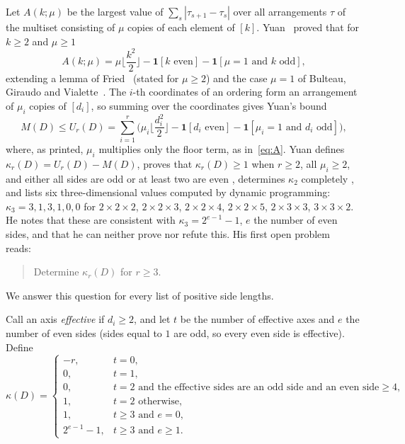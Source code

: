 \documentclass[11pt]{article}
\theoremstyle{remark}
\newcommand{\ind}{\mathbf 1}
\begin{document}
Let $A(k;\mu)$ be the largest value of $\sum_s|\tau_{s+1}-\tau_s|$ over all
arrangements $\tau$ of the multiset consisting of $\mu$ copies of each element
of $[k]$. Yuan~\cite[Theorem~2.3]{yuan} proved that for $k\ge2$ and $\mu\ge1$
\begin{equation}\label{eq:A}
A(k;\mu)=\mu\Big\lfloor\frac{k^2}{2}\Big\rfloor-\ind[k\text{ even}]
-\ind[\mu=1\text{ and }k\text{ odd}],
\end{equation}
extending a lemma of Fried~\cite{fried} (stated for $\mu\ge2$) and the case
$\mu=1$ of Bulteau, Giraudo and Vialette~\cite{bgv}. The $i$-th coordinates of
an ordering form an arrangement of $\mu_i$ copies of $[d_i]$, so summing over
the coordinates gives Yuan's bound~\cite[(6)]{yuan}
\begin{equation}\label{eq:U}
M(D)\le U_r(D)=\sum_{i=1}^r\Big(\mu_i\Big\lfloor\frac{d_i^2}{2}\Big\rfloor
-\ind[d_i\text{ even}]-\ind[\mu_i=1\text{ and }d_i\text{ odd}]\Big),
\end{equation}
where, as printed, $\mu_i$ multiplies only the floor term, as
in~\eqref{eq:A}. Yuan defines
$\kappa_r(D)=U_r(D)-M(D)$, proves that $\kappa_r(D)\ge1$ when $r\ge2$, all
$\mu_i\ge2$, and either all sides are odd or at least two are even
\cite[Proposition~6.1]{yuan}, determines $\kappa_2$ completely
\cite[Section~6.2]{yuan}, and lists six three-dimensional values computed by
dynamic programming:
$\kappa_3=3,1,3,1,0,0$ for $2\times2\times2$, $2\times2\times3$,
$2\times2\times4$, $2\times2\times5$, $2\times3\times3$, $3\times3\times2$.
He notes that these are consistent with $\kappa_3=2^{e-1}-1$, $e$ the number
of even sides, and that he can neither prove nor refute this. His first open
problem~\cite[Section~6.3]{yuan} reads:
\begin{quote}
Determine $\kappa_r(D)$ for $r\ge3$.
\end{quote}
We answer this question for every list of positive side lengths.

Call an axis \emph{effective} if $d_i\ge2$, and let $t$ be the number of
effective axes and $e$ the number of even sides (sides equal to $1$ are odd,
so every even side is effective). Define
\begin{equation}\label{eq:kappa}
\kappa(D)=\begin{cases}
-r,& t=0,\\
0,& t=1,\\
0,& t=2\text{ and the effective sides are an odd side and an even side}\ge4,\\
1,& t=2\text{ otherwise},\\
1,& t\ge3\text{ and }e=0,\\
2^{e-1}-1,& t\ge3\text{ and }e\ge1.
\end{cases}
\end{equation}
\end{document}
